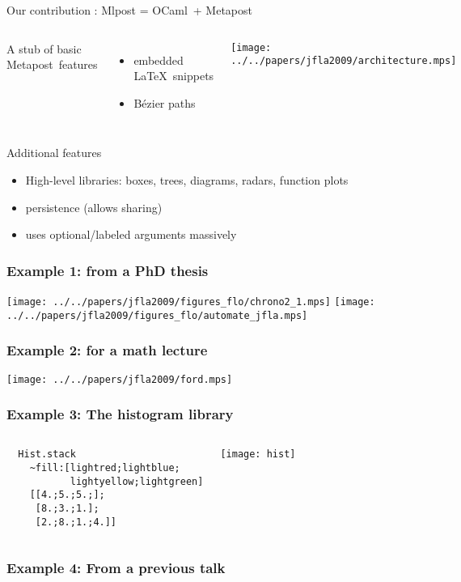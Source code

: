 \documentclass[nodefaultblocks]{beamer}
\newcommand{\ocaml}{OCaml}
\newcommand{\metapost}{Metapost}
\begin{document}
\begin{frame}{Our contribution : Mlpost = \ocaml\ + \metapost}

  \begin{columns}
  A stub of basic \metapost\ features
  \begin{itemize}
    \item embedded \LaTeX\ snippets
      \item Bézier paths
  \end{itemize}

  \texttt{[image: ../../papers/jfla2009/architecture.mps]}
  \end{columns}
  \bigskip
  Additional features
  \begin{itemize}
    \item High-level libraries: boxes, trees, diagrams, radars, function plots
  \item persistence (allows sharing) 
  \item uses optional/labeled arguments massively
  \end{itemize}

\end{frame}

\begin{frame}
  \frametitle{Example 1: from a PhD thesis}
  \texttt{[image: ../../papers/jfla2009/figures\_flo/chrono2\_1.mps]}
  \texttt{[image: ../../papers/jfla2009/figures\_flo/automate\_jfla.mps]}
\end{frame}

\begin{frame}
\frametitle{Example 2: for a math lecture}
\begin{center}
  \texttt{[image: ../../papers/jfla2009/ford.mps]} 
\end{center}
\end{frame}

\begin{frame}[fragile]
\frametitle{Example 3: The histogram library}
\begin{columns}
\begin{verbatim}
  Hist.stack 
    ~fill:[lightred;lightblue;
           lightyellow;lightgreen]
    [[4.;5.;5.;]; 
     [8.;3.;1.]; 
     [2.;8.;1.;4.]]  
\end{verbatim}
\begin{center}
  \texttt{[image: hist]}
\end{center}

\end{columns}

\end{frame}
\begin{frame}
\frametitle{Example 4: From a previous talk}
\end{frame}
\end{document}
